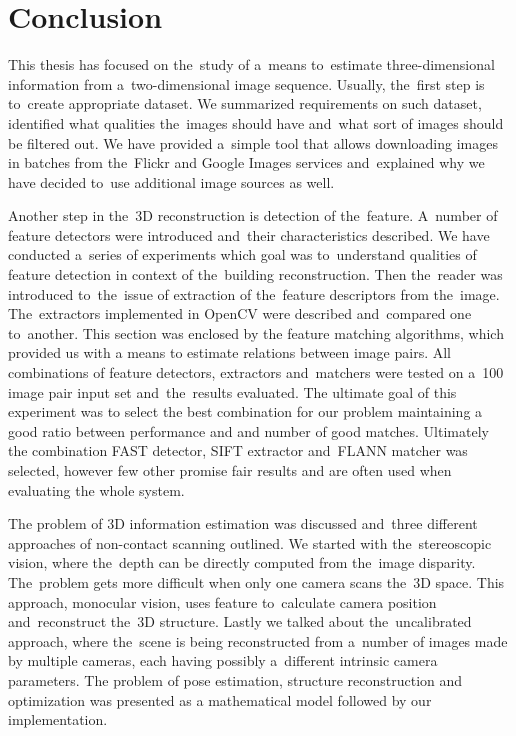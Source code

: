 \section{Conclusion}
This thesis has focused on the~study of a~means to~estimate three-dimensional information from a~two-dimensional image sequence. Usually, the~first step is to~create appropriate dataset. We summarized requirements on such dataset, identified what qualities the~images should have and~what sort of images should be filtered out. We have provided a~simple tool that allows downloading images in batches from the~Flickr and Google Images services and~explained why we have decided to~use additional image sources as well. 

Another step in the~3D reconstruction is detection of the~feature. A~number of feature detectors were introduced and~their characteristics described. We have conducted a~series of experiments which goal was to~understand qualities of feature detection in context of the~building reconstruction. Then the~reader was introduced to~the~issue of extraction of the~feature descriptors from the~image. The~extractors implemented in OpenCV were described and~compared one to~another. This section was enclosed by the feature matching algorithms, which provided us with a means to estimate relations between image pairs. All combinations of feature detectors, extractors and~matchers were tested on a~100 image pair input set and~the~results evaluated. The ultimate goal of this experiment was to select the best combination for our problem maintaining a good ratio between performance and and number of good matches. Ultimately the combination FAST detector, SIFT extractor and~FLANN matcher was selected, however few other promise fair results and are often used when evaluating the whole system.

The problem of 3D information estimation was discussed and~three different approaches of non-contact scanning outlined. We started with the~stereoscopic vision, where the~depth can be directly computed from the~image disparity. The~problem gets more difficult when only one camera scans the~3D space. This approach, monocular vision, uses feature to~calculate camera position and~reconstruct the~3D structure. Lastly we talked about the~uncalibrated approach, where the~scene is being reconstructed from a~number of images made by multiple cameras, each having possibly a~different intrinsic camera parameters. The problem of pose estimation, structure reconstruction and optimization was presented as a mathematical model followed by our implementation.


